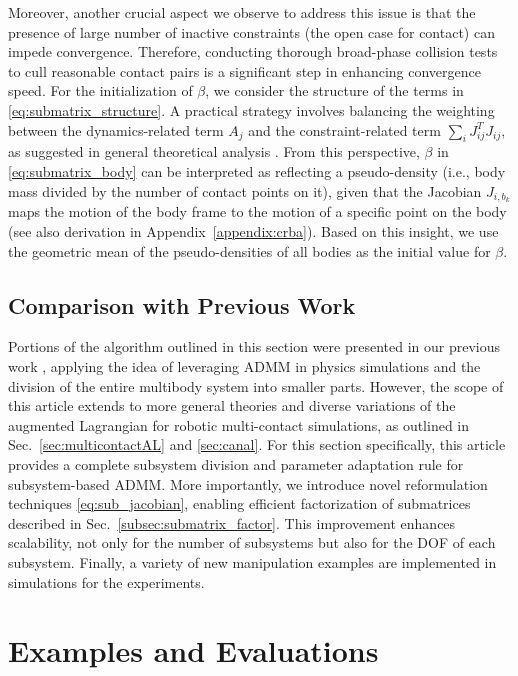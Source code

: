 \documentclass[lettersize,journal]{IEEEtran}
\begin{document}
Moreover, another crucial aspect we observe to address this issue is that the presence of large number of inactive constraints (the open case for contact) can impede convergence. 
Therefore, conducting thorough broad-phase collision tests to cull reasonable contact pairs is a significant step in enhancing convergence speed.
For the initialization of $\beta$, we consider the structure of the terms in \eqref{eq:submatrix_structure}. A practical strategy involves balancing the weighting between the dynamics-related term $A_j$ and the constraint-related term $\sum_i J_{ij}^T J_{ij}$, as suggested in general theoretical analysis \cite{ghadimi2014optimal,giselsson2016linear}.
From this perspective, $\beta$ in \eqref{eq:submatrix_body} can be interpreted as reflecting a pseudo-density (i.e., body mass divided by the number of contact points on it), given that the Jacobian $J_{i,b_k}$ maps the motion of the body frame to the motion of a specific point on the body (see also derivation in Appendix~\ref{appendix:crba}).
Based on this insight, we use the geometric mean of the pseudo-densities of all bodies as the initial value for $\beta$.

\subsection{Comparison with Previous Work}

Portions of the algorithm outlined in this section were presented in our previous work \cite{lee2023modular}, applying the idea of leveraging ADMM in physics simulations and the division of the entire multibody system into smaller parts. 
However, the scope of this article extends to more general theories and diverse variations of the augmented Lagrangian for robotic multi-contact simulations, as outlined in Sec.~\ref{sec:multicontactAL} and \ref{sec:canal}. 
For this section specifically, this article provides a complete subsystem division and parameter adaptation rule for subsystem-based ADMM. 
More importantly, we introduce novel reformulation techniques \eqref{eq:sub_jacobian}, enabling efficient factorization of submatrices described in Sec.~\ref{subsec:submatrix_factor}. This improvement enhances scalability, not only for the number of subsystems but also for the DOF of each subsystem.
Finally, a variety of new manipulation examples are implemented in simulations for the experiments.


\section{Examples and Evaluations} \label{sec:exampleeval}
\end{document}

